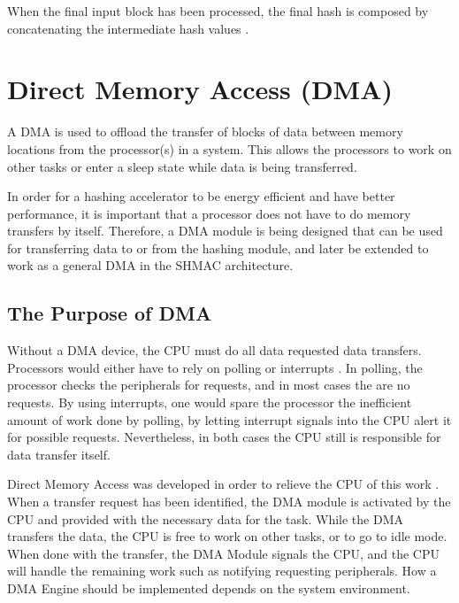 When the final input block has been processed, the final hash is composed by
concatenating the intermediate hash values \cite{sha-spec}.

\section{Direct Memory Access (DMA)}

A DMA is used to offload the transfer of blocks of data between memory locations from
the processor(s) in a system. This allows the processors to work on other tasks or enter
a sleep state while data is being transferred.

In order for a hashing accelerator to be energy efficient and have better performance,
it is important that a processor does not have to do memory transfers by itself. Therefore,
a DMA module is being designed that can be used for transferring data to or from the hashing
module, and later be extended to work as a general DMA in the SHMAC architecture.

\subsection{The Purpose of DMA}

Without a DMA device, the CPU must do all data requested data transfers.
Processors would either have to rely on polling or interrupts \cite[p~589]{computer-construction}.
In polling, the processor checks the peripherals for requests, and in most cases the are no requests.
By using interrupts, one would spare the processor the inefficient amount of work done by polling, by letting interrupt signals into the CPU alert it for possible requests.
Nevertheless, in both cases the CPU still is responsible for data transfer itself.



Direct Memory Access was developed in order to relieve the CPU of this work \cite[p~592]{computer-construction}.
When a transfer request has been identified, the DMA module is activated by the CPU and provided with the necessary data for the task.
While the DMA transfers the data, the CPU is free to work on other tasks, or to go to idle mode.
When done with the transfer, the DMA Module signals the CPU, and the CPU will handle the remaining work such as notifying requesting peripherals. How a DMA Engine should be implemented depends on the system environment.

